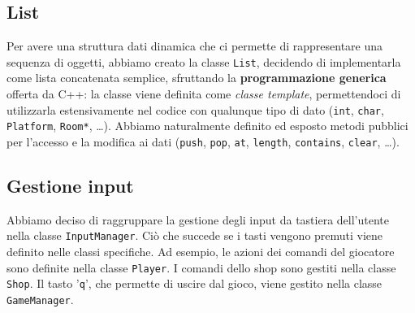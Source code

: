 \documentclass[a4paper,12pt]{article}
\begin{document}
\subsection{List}
Per avere una struttura dati dinamica che ci permette di rappresentare una sequenza di oggetti, abbiamo creato la classe \texttt{List}, decidendo di implementarla come lista concatenata semplice, sfruttando la \textbf{programmazione generica} offerta da C++: la classe viene definita come \textit{classe template}, permettendoci di utilizzarla estensivamente nel codice con qualunque tipo di dato (\texttt{int}, \texttt{char}, \texttt{Platform}, \texttt{Room*}, …).
Abbiamo naturalmente definito ed esposto metodi pubblici per l'accesso e la modifica ai dati (\texttt{push}, \texttt{pop}, \texttt{at}, \texttt{length}, \texttt{contains}, \texttt{clear}, …).

\subsection{Gestione input}
Abbiamo deciso di raggruppare la gestione degli input da tastiera dell'utente nella classe \texttt{InputManager}. Ciò che succede se i tasti vengono premuti viene definito nelle classi specifiche. Ad esempio, le azioni dei comandi del giocatore sono definite nella classe \texttt{Player}. I comandi dello shop sono gestiti nella classe \texttt{Shop}. Il tasto '\texttt{q}', che permette di uscire dal gioco, viene gestito nella classe \texttt{GameManager}. 
\end{document}
